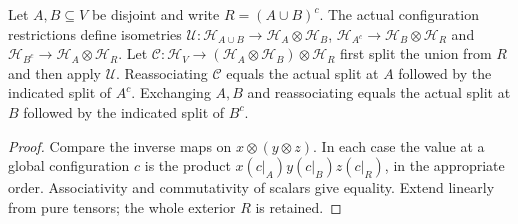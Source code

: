 \begin{lemma}
    \label{thm:regional_tensor_diagrams}
    \leanok
    Let $A,B\subseteq V$ be disjoint and write $R=(A\cup B)^c$.
    The actual configuration restrictions define isometries
    $\mathcal U:\mathcal H_{A\cup B}\to\mathcal H_A\otimes\mathcal H_B$,
    $\mathcal H_{A^c}\to\mathcal H_B\otimes\mathcal H_R$ and
    $\mathcal H_{B^c}\to\mathcal H_A\otimes\mathcal H_R$.
    Let $\mathcal C:\mathcal H_V\to
        (\mathcal H_A\otimes\mathcal H_B)\otimes\mathcal H_R$
    first split the union from $R$ and then apply $\mathcal U$.
    Reassociating $\mathcal C$ equals the actual split at $A$ followed by
    the indicated split of $A^c$. Exchanging $A,B$ and reassociating equals
    the actual split at $B$ followed by the indicated split of $B^c$.
\end{lemma}
\begin{proof}\leanok
    Compare the inverse maps on $x\otimes(y\otimes z)$.
    In each case the value at a global configuration $c$ is the product
    $x(c|_A)y(c|_B)z(c|_R)$, in the appropriate order. Associativity and
    commutativity of scalars give equality. Extend linearly from pure
    tensors; the whole exterior $R$ is retained.
\end{proof}


